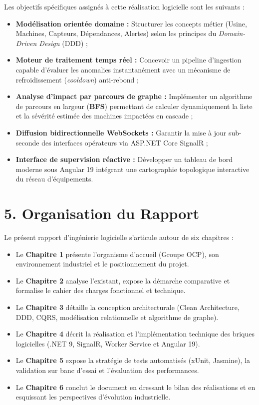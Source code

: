 Les objectifs spécifiques assignés à cette réalisation logicielle sont les suivants :
\begin{itemize}
    \item \textbf{Modélisation orientée domaine :} Structurer les concepts métier (Usine, Machines, Capteurs, Dépendances, Alertes) selon les principes du \textit{Domain-Driven Design} (DDD) ;
    \item \textbf{Moteur de traitement temps réel :} Concevoir un pipeline d'ingestion capable d'évaluer les anomalies instantanément avec un mécanisme de refroidissement (\textit{cooldown}) anti-rebond ;
    \item \textbf{Analyse d'impact par parcours de graphe :} Implémenter un algorithme de parcours en largeur (\textbf{BFS}) permettant de calculer dynamiquement la liste et la sévérité estimée des machines impactées en cascade ;
    \item \textbf{Diffusion bidirectionnelle WebSockets :} Garantir la mise à jour sub-seconde des interfaces opérateurs via ASP.NET Core SignalR ;
    \item \textbf{Interface de supervision réactive :} Développer un tableau de bord moderne sous Angular 19 intégrant une cartographie topologique interactive du réseau d'équipements.
\end{itemize}

\section*{5. Organisation du Rapport}

Le présent rapport d'ingénierie logicielle s'articule autour de six chapitres :
\begin{itemize}
    \item Le \textbf{Chapitre 1} présente l'organisme d'accueil (Groupe OCP), son environnement industriel et le positionnement du projet.
    \item Le \textbf{Chapitre 2} analyse l'existant, expose la démarche comparative et formalise le cahier des charges fonctionnel et technique.
    \item Le \textbf{Chapitre 3} détaille la conception architecturale (Clean Architecture, DDD, CQRS, modélisation relationnelle et algorithme de graphe).
    \item Le \textbf{Chapitre 4} décrit la réalisation et l'implémentation technique des briques logicielles (.NET 9, SignalR, Worker Service et Angular 19).
    \item Le \textbf{Chapitre 5} expose la stratégie de tests automatisés (xUnit, Jasmine), la validation sur banc d'essai et l'évaluation des performances.
    \item Le \textbf{Chapitre 6} conclut le document en dressant le bilan des réalisations et en esquissant les perspectives d'évolution industrielle.
\end{itemize}
